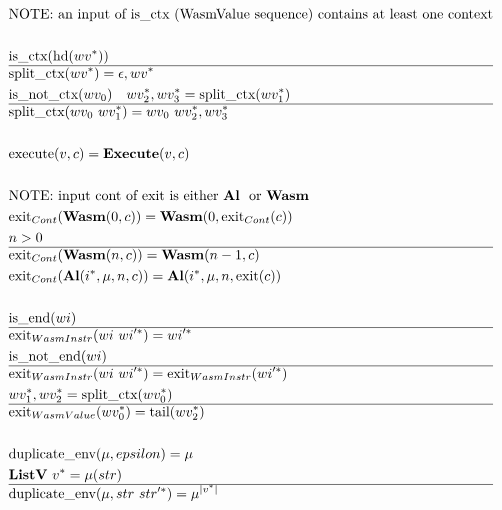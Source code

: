 \begin{align*}
&\text{NOTE: an input of is\_ctx (WasmValue sequence) contains at least one context} \\
%
\newline \\
  &\text{is\_ctx}(\text{hd}(\seq{wv})) \\
  \hline
  &\splitctx(\seq{wv}) = \epsilon, \seq{wv} \\
%
  &\text{is\_not\_ctx}(wv_0) \quad \seq{wv_2}, \seq{wv_3} = \splitctx(\seq{wv_1}) \\
  \hline
  &\splitctx(wv_0 ~ \seq{wv_1}) = wv_0 ~ \seq{wv_2}, \seq{wv_3} \\
%
\newline \\
  &\execute(v, c) = \exe(v, c) \\
%
\newline \\
&\text{NOTE: input cont of exit is either \al ~ or \wasm} \\
  &\exit_{Cont}(\wasm (0, c)) = \wasm(0, \exit_{Cont}(c)) \\
%
  &n > 0 \\
  \hline
  &\exit_{Cont}(\wasm (n, c)) = \wasm(n-1, c) \\
%
  &\exit_{Cont}(\al (\seq i, \mu, n, c)) = \al (\seq i, \mu, n, \exit(c)) \\
%
\newline \\
  &\text{is\_end}(wi) \\
  \hline
  &\exit_{WasmInstr}(wi ~ \seq{wi'}) = \seq{wi'} \\
%
  &\text{is\_not\_end}(wi) \\
  \hline
  &\exit_{WasmInstr}(wi ~ \seq{wi'}) = \exit_{WasmInstr}(\seq{wi'}) \\
%
  &\seq{wv_1}, \seq{wv_2} = \splitctx(\seq{wv_0}) \\
  \hline
  &\exit_{WasmValue}(\seq{wv_0}) = \text{tail}(\seq{wv_2}) \\
%
\newline \\
  &\duplicateenv(\mu, epsilon) = \mu \\
%
  &\listv ~ \seq v = \mu(str) \\
  \hline
  &\duplicateenv(\mu, str ~ \seq{str'}) = \mu^{|\seq v|} \\

\end{align*}
